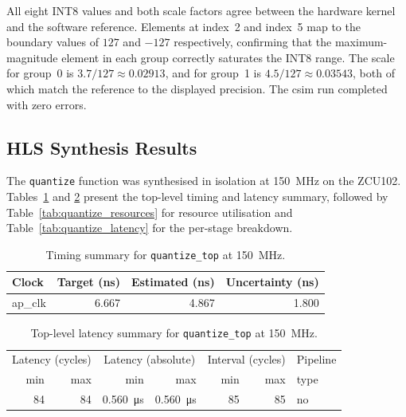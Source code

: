 All eight INT8 values and both scale factors agree between the
hardware kernel and the software reference. Elements at index~2 and
index~5 map to the boundary values of $127$ and $-127$ respectively,
confirming that the maximum-magnitude element in each group correctly
saturates the INT8 range. The scale for group~0 is $3.7 / 127 \approx
0.02913$, and for group~1 is $4.5 / 127 \approx 0.03543$, both of which
match the reference to the displayed precision. The csim run completed
with zero errors.

\subsection{HLS Synthesis Results}
\label{subsec:quantize_csyn}

The \texttt{quantize} function was synthesised in isolation at
\SI{150}{\mega\hertz} on the ZCU102.
Tables~\ref{tab:quantize_timing} and \ref{tab:quantize_top_latency}
present the top-level timing and latency summary, followed by
Table~\ref{tab:quantize_resources} for resource utilisation and
Table~\ref{tab:quantize_latency} for the per-stage breakdown.

\begin{table}[H]
  \centering
  \begin{tabular}{lrrr}
    \toprule
    Clock & Target (ns) & Estimated (ns) & Uncertainty (ns) \\
    \midrule
    ap\_clk & 6.667 & 4.867 & 1.800 \\
    \bottomrule
  \end{tabular}
  \caption{Timing summary for \texttt{quantize\_top} at
           \SI{150}{\mega\hertz}.}
  \label{tab:quantize_timing}

\end{table}

\begin{table}[H]
  \centering
  \begin{tabular}{rrrrrrl}
    \toprule
    \multicolumn{2}{c}{Latency (cycles)} &
    \multicolumn{2}{c}{Latency (absolute)} &
    \multicolumn{2}{c}{Interval (cycles)} & Pipeline \\
    min & max & min & max & min & max & type \\
    \midrule
    84 & 84 & \SI{0.560}{\micro\second} & \SI{0.560}{\micro\second} & 85 & 85 & no \\
    \bottomrule
  \end{tabular}
  \caption{Top-level latency summary for \texttt{quantize\_top} at
           \SI{150}{\mega\hertz}.}
  \label{tab:quantize_top_latency}

\end{table}

